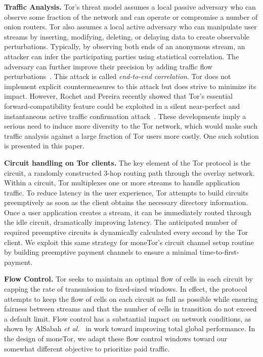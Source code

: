 \textbf{Traffic Analysis.}
Tor's threat model assumes a local passive adversary who can observe some fraction of the network and can operate or compromise a number of onion routers.
Tor also assumes a local active adversary who can manipulate user streams by inserting, modifying, deleting, or delaying data to create observable perturbations.
Typically, by observing both ends of an anonymous stream, an attacker can infer the participating parties using statistical correlation.
The adversary can further improve their precision by adding traffic flow perturbations~\cite{fu2009one}.
This attack is called \textit{end-to-end correlation}.
Tor does not implement explicit countermeasures to this attack but does strive to minimize its impact.
However, Rochet and Pereira recently showed that Tor's essential forward-compatibility feature could be exploited in a silent near-perfect and instantaneous active traffic confirmation attack~\cite{rochet2018dropping}.
These developments imply a serious need to induce more diversity to the Tor network, which would make such traffic analysis against a large fraction of Tor users more costly.
One such solution is presented in this paper.

\medskip \noindent \textbf{Circuit handling on Tor clients.}
The key element of the Tor protocol is the circuit, a randomly constructed 3-hop routing path through the overlay network.
Within a circuit, Tor multiplexes one or more streams to handle application traffic.
To reduce latency in the user experience, Tor attempts to build circuits preemptively as soon as the client obtains the necessary directory information.
Once a user application creates a stream, it can be immediately routed through the idle circuit, dramatically improving latency.
The anticipated number of required preemptive circuits is dynamically calculated every second by the Tor client.
We exploit this same strategy for moneTor's circuit channel setup routine by building preemptive payment channels to ensure a minimal time-to-first-payment.

\medskip \noindent\textbf{Flow Control.}
Tor seeks to maintain an optimal flow of cells in each circuit by capping the rate of transmission to fixed-sized windows.
In effect, the protocol attempts to keep the flow of cells on each circuit as full as possible while ensuring fairness between streams and that the number of cells in transition do not exceed a default limit.
Flow control has a substantial impact on network conditions, as shown by AlSabah \textit{et al.}~\cite{pets2011-defenestrator} in work toward improving total global performance.
In the design of moneTor, we adapt these flow control windows toward our somewhat different objective to prioritize paid traffic.


